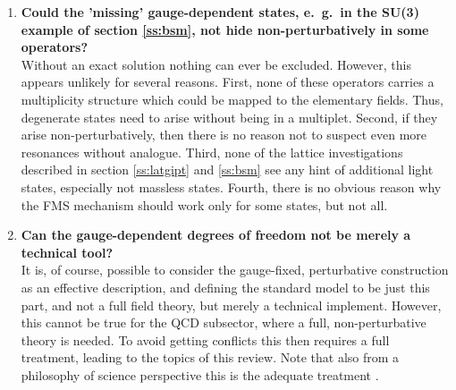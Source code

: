 \documentclass[final,twoside,12pt]{article}
\newcommand*{\1}{1\!\!\!\bot}
\begin{document}
\begin{enumerate}
 \item {\bf Could the 'missing' gauge-dependent states, e.\ g.\ in the SU(3) example of section \ref{ss:bsm}, not hide non-perturbatively in some operators?}\\
 Without an exact solution nothing can ever be excluded. However, this appears unlikely for several reasons. First, none of these operators carries a multiplicity structure which could be mapped to the elementary fields. Thus, degenerate states need to arise without being in a multiplet. Second, if they arise non-perturbatively, then there is no reason not to suspect even more resonances without analogue. Third, none of the lattice investigations described in section \ref{ss:latgipt} and \ref{ss:bsm} see any hint of additional light states, especially not massless states. Fourth, there is no obvious reason why the FMS mechanism should work only for some states, but not all.
 
 \item {\bf Can the gauge-dependent degrees of freedom not be merely a technical tool?}\\
 It is, of course, possible to consider the gauge-fixed, perturbative construction as an effective description, and defining the standard model to be just this part, and not a full field theory, but merely a technical implement. However, this cannot be true for the QCD subsector, where a full, non-perturbative theory is needed. To avoid getting conflicts this then requires a full treatment, leading to the topics of this review. Note that also from a philosophy of science perspective this is the adequate treatment \cite{Lyre:2008af,Francois:2017aa}.
 

\end{enumerate}
\end{document}
